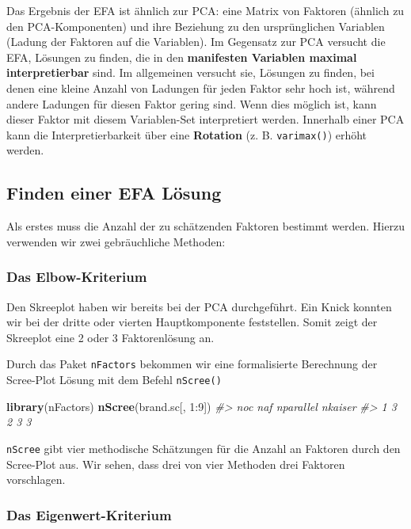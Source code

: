\documentclass[12pt,]{book}
\newenvironment{Shaded}{\begin{snugshade}}{\end{snugshade}}
\newcommand{\KeywordTok}[1]{\textcolor[rgb]{0.13,0.29,0.53}{\textbf{{#1}}}}
\newcommand{\DecValTok}[1]{\textcolor[rgb]{0.00,0.00,0.81}{{#1}}}
\newcommand{\CommentTok}[1]{\textcolor[rgb]{0.56,0.35,0.01}{\textit{{#1}}}}
\newcommand{\NormalTok}[1]{{#1}}
\begin{document}
Das Ergebnis der EFA ist ähnlich zur PCA: eine Matrix von Faktoren
(ähnlich zu den PCA-Komponenten) und ihre Beziehung zu den
ursprünglichen Variablen (Ladung der Faktoren auf die Variablen). Im
Gegensatz zur PCA versucht die EFA, Lösungen zu finden, die in den
\textbf{manifesten Variablen maximal interpretierbar} sind. Im
allgemeinen versucht sie, Lösungen zu finden, bei denen eine kleine
Anzahl von Ladungen für jeden Faktor sehr hoch ist, während andere
Ladungen für diesen Faktor gering sind. Wenn dies möglich ist, kann
dieser Faktor mit diesem Variablen-Set interpretiert werden. Innerhalb
einer PCA kann die Interpretierbarkeit über eine \textbf{Rotation} (z.
B. \texttt{varimax()}) erhöht werden.

\subsection{Finden einer EFA Lösung}\label{finden-einer-efa-losung}

Als erstes muss die Anzahl der zu schätzenden Faktoren bestimmt werden.
Hierzu verwenden wir zwei gebräuchliche Methoden:

\subsubsection{Das Elbow-Kriterium}\label{das-elbow-kriterium}

Den Skreeplot haben wir bereits bei der PCA durchgeführt. Ein Knick
konnten wir bei der dritte oder vierten Hauptkomponente feststellen.
Somit zeigt der Skreeplot eine 2 oder 3 Faktorenlösung an.

Durch das Paket \texttt{nFactors} bekommen wir eine formalisierte
Berechnung der Scree-Plot Lösung mit dem Befehl \texttt{nScree()}

\begin{Shaded}
\begin{Highlighting}[]
\KeywordTok{library}\NormalTok{(nFactors)}
\KeywordTok{nScree}\NormalTok{(brand.sc[, }\DecValTok{1}\NormalTok{:}\DecValTok{9}\NormalTok{])}
\CommentTok{#>   noc naf nparallel nkaiser}
\CommentTok{#> 1   3   2         3       3}
\end{Highlighting}
\end{Shaded}

\texttt{nScree} gibt vier methodische Schätzungen für die Anzahl an
Faktoren durch den Scree-Plot aus. Wir sehen, dass drei von vier
Methoden drei Faktoren vorschlagen.

\subsubsection{Das Eigenwert-Kriterium}\label{das-eigenwert-kriterium}
\end{document}
